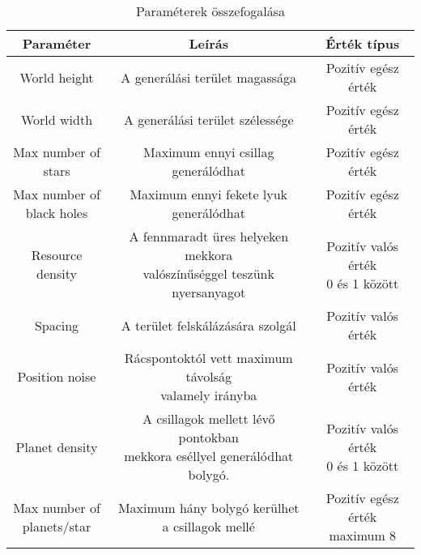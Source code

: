 \newpage
\begin{table}[htbp]
\caption{Paraméterek összefogalása}
\begin{center}
\begin{tabular}{ |c|c|c| } 
\hline
Paraméter & Leírás & Érték típus \\
 \hline\hline
  World height & A generálási terület magassága & Pozitív egész érték \\
 \hline
 World width & A generálási terület szélessége & Pozitív egész érték \\
 \hline
 \makecell{Max number of\\ stars} & Maximum ennyi csillag generálódhat  & Pozitív egész érték \\ 
  \hline
  \makecell{ Max number of \\ black holes} & Maximum ennyi fekete lyuk generálódhat  & Pozitív egész érték \\ 
 \hline
  Resource density & \makecell{A fennmaradt üres helyeken mekkora \\ valószínűséggel teszünk nyersanyagot} & \makecell{Pozitív valós érték \\0 és 1 között }\\
 \hline
  Spacing & A terület felskálázására szolgál & Pozitív valós érték \\
 \hline
 Position noise & \makecell{Rácspontoktól vett maximum távolság \\ valamely irányba} & Pozitív valós érték \\
 \hline
  Planet density & \makecell{A csillagok mellett lévő pontokban\\ mekkora eséllyel generálódhat bolygó.} & \makecell{Pozitív valós érték \\0 és 1 között}\\
 \hline
\makecell{Max number of\\ planets/star} & \makecell{Maximum hány bolygó kerülhet \\ a csillagok mellé} & \makecell{Pozitív egész érték \\ maximum 8}\\
 \hline
\end{tabular}
\end{center}
\end{table}

\newpage

